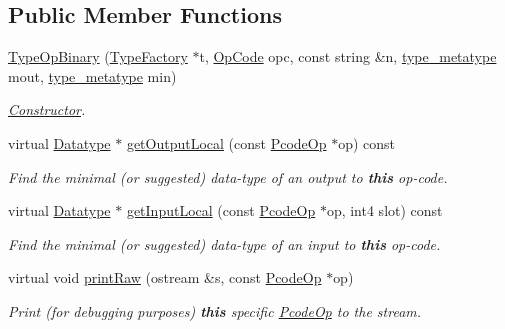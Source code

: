 \subsection*{Public Member Functions}
\begin{DoxyCompactItemize}
\item 
\mbox{\hyperlink{class_type_op_binary_a4009e7dc1b773c67e405e9ac66fe8fad}{Type\+Op\+Binary}} (\mbox{\hyperlink{class_type_factory}{Type\+Factory}} $\ast$t, \mbox{\hyperlink{opcodes_8hh_abeb7dfb0e9e2b3114e240a405d046ea7}{Op\+Code}} opc, const string \&n, \mbox{\hyperlink{type_8hh_aef6429f2523cdf4d415ba04a0209e61f}{type\+\_\+metatype}} mout, \mbox{\hyperlink{type_8hh_aef6429f2523cdf4d415ba04a0209e61f}{type\+\_\+metatype}} min)
\begin{DoxyCompactList}\small\item\em \mbox{\hyperlink{class_constructor}{Constructor}}. \end{DoxyCompactList}\item 
virtual \mbox{\hyperlink{class_datatype}{Datatype}} $\ast$ \mbox{\hyperlink{class_type_op_binary_a183a65ebb3716a380229e38c3383fd98}{get\+Output\+Local}} (const \mbox{\hyperlink{class_pcode_op}{Pcode\+Op}} $\ast$op) const
\begin{DoxyCompactList}\small\item\em Find the minimal (or suggested) data-\/type of an output to {\bfseries{this}} op-\/code. \end{DoxyCompactList}\item 
virtual \mbox{\hyperlink{class_datatype}{Datatype}} $\ast$ \mbox{\hyperlink{class_type_op_binary_a6b8460b8ee0e97579321c6d02fe4fd29}{get\+Input\+Local}} (const \mbox{\hyperlink{class_pcode_op}{Pcode\+Op}} $\ast$op, int4 slot) const
\begin{DoxyCompactList}\small\item\em Find the minimal (or suggested) data-\/type of an input to {\bfseries{this}} op-\/code. \end{DoxyCompactList}\item 
virtual void \mbox{\hyperlink{class_type_op_binary_a3f26fc1e6bc1d143fb4f8391ef7ff3d6}{print\+Raw}} (ostream \&s, const \mbox{\hyperlink{class_pcode_op}{Pcode\+Op}} $\ast$op)
\begin{DoxyCompactList}\small\item\em Print (for debugging purposes) {\bfseries{this}} specific \mbox{\hyperlink{class_pcode_op}{Pcode\+Op}} to the stream. \end{DoxyCompactList}\end{DoxyCompactItemize}
